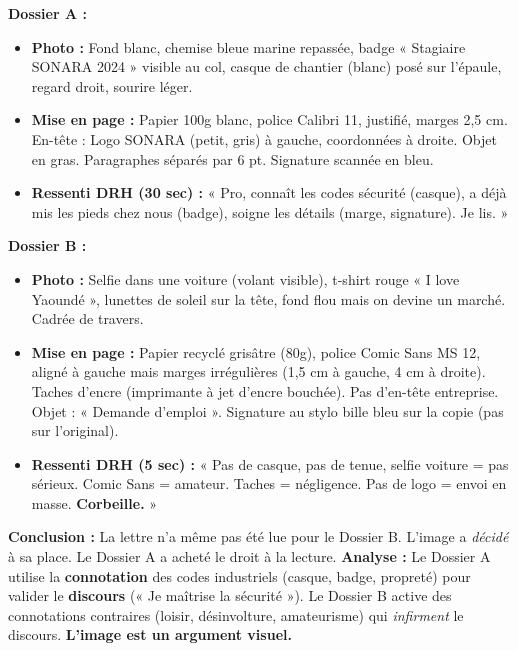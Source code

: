 \documentclass[11pt]{article}
\begin{document}
\begin{exoresolu}
\textbf{Dossier A :}
\begin{itemize}
    \item \textbf{Photo :} Fond blanc, chemise bleue marine repassée, badge « Stagiaire SONARA 2024 » visible au col, casque de chantier (blanc) posé sur l'épaule, regard droit, sourire léger.
    \item \textbf{Mise en page :} Papier 100g blanc, police Calibri 11, justifié, marges 2,5 cm. En-tête : Logo SONARA (petit, gris) à gauche, coordonnées à droite. Objet en gras. Paragraphes séparés par 6 pt. Signature scannée en bleu.
    \item \textbf{Ressenti DRH (30 sec) :} « Pro, connaît les codes sécurité (casque), a déjà mis les pieds chez nous (badge), soigne les détails (marge, signature). Je lis. »
\end{itemize}

\textbf{Dossier B :}
\begin{itemize}
    \item \textbf{Photo :} Selfie dans une voiture (volant visible), t-shirt rouge « I love Yaoundé », lunettes de soleil sur la tête, fond flou mais on devine un marché. Cadrée de travers.
    \item \textbf{Mise en page :} Papier recyclé grisâtre (80g), police Comic Sans MS 12, aligné à gauche mais marges irrégulières (1,5 cm à gauche, 4 cm à droite). Taches d'encre (imprimante à jet d'encre bouchée). Pas d'en-tête entreprise. Objet : « Demande d'emploi ». Signature au stylo bille bleu sur la copie (pas sur l'original).
    \item \textbf{Ressenti DRH (5 sec) :} « Pas de casque, pas de tenue, selfie voiture = pas sérieux. Comic Sans = amateur. Taches = négligence. Pas de logo = envoi en masse. \textbf{Corbeille.} »
\end{itemize}

\textbf{Conclusion :} La lettre n'a même pas été lue pour le Dossier B. L'image a \emph{décidé} à sa place. Le Dossier A a acheté le droit à la lecture.
\tcblower
\textbf{Analyse :} Le Dossier A utilise la \textbf{connotation} des codes industriels (casque, badge, propreté) pour valider le \textbf{discours} (« Je maîtrise la sécurité »). Le Dossier B active des connotations contraires (loisir, désinvolture, amateurisme) qui \emph{infirment} le discours. \textbf{L'image est un argument visuel.}
\end{exoresolu}
\end{document}
